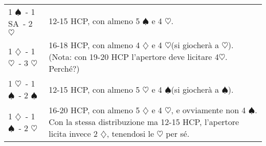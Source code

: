 \documentclass[a4paper,10pt]{article}
\renewcommand{\c}{$\clubsuit$\xspace}
\renewcommand{\d}{$\diamondsuit$\xspace}
\newcommand{\h}{$\heartsuit$\xspace}
\newcommand{\s}{$\spadesuit$\xspace}
\renewcommand{\j}{$\bigstar$\xspace}
\newcommand{\sa}{SA\xspace}
\newcommand{\smallspace}{\vskip0.3cm}
\newenvironment{twocol}
  {\smallspace\noindent\begin{tabular}{l p{0.78\textwidth}}}
  {\end{tabular}\smallspace}
\begin{document}
\begin{twocol}
1 \s\ - 1 \sa\ - 2 \h & 12-15 HCP, con almeno 5 \s e 4 \h.\\
1 \d\ - 1 \h\ - 3 \h & 16-18 HCP, con almeno 4 \d e 4 \h (si giocherà a \h). (Nota: con 19-20 HCP l'apertore deve licitare 4\h. Perché?)\\
1 \h\ - 1 \s\ - 2 \s & 12-15 HCP, con almeno 5 \h e 4 \s (si giocherà a \s).\\
1 \d\ - 1 \s\ - 2 \h & 16-20 HCP, con almeno 5 \d e 4 \h, e ovviamente non 4 \s. Con la stessa distribuzione ma 12-15 HCP, l'apertore licita invece 2 \d, tenendosi le \h per sé.
\end{twocol}

% 
% 
% 
% 
% 
% 
% 
% 
% 
% 
\end{document}
